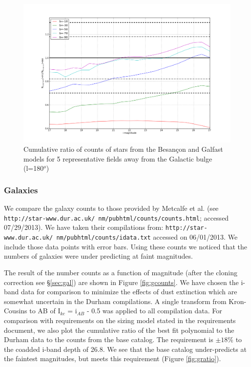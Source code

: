 \documentclass[]{article}
\begin{document}
{\begin{figure}[H]
\includegraphics[width=5in]{validation_figures/cumulative_ratio_stars_180_besancon_dust.png}
\caption{Cumulative ratio of counts of stars from the Besan\c{c}on and Galfast models for 5 representative fields away from the Galactic bulge (l=180$^o$) \label{fig:sratio_180}}
\end{figure}

\subsubsection{Galaxies \label{sec:galaxycounts}}
We compare the galaxy counts to those provided by Metcalfe et al. (see {\tt http://star-www.dur.ac.uk/~nm/pubhtml/counts/counts.html}; 
accessed 07/29/2013).  We have taken their compilations from:
{\tt http://star-www.dur.ac.uk/~nm/pubhtml/counts/idata.txt} accessed on 06/01/2013.  
We include those data points with error bars.  
Using these counts
we noticed that the numbers of galaxies were under predicting at faint magnitudes.  

The result of the number counts as a function of magnitude (after the cloning correction see \S \ref{sec:gal}) are shown in Figure \ref{fig:gcounts}.  
We have chosen the i-band data for comparison to 
minimize the effects of dust extinction which are somewhat uncertain in the Durham compilations.  A single transform from Kron-Cousins to AB of I$_{kc}$ = i$_{AB}$ - 0.5 was applied to
all compilation data.  For comparison with requirements on the sizing model stated in the requirements document, we also plot the cumulative ratio of the best fit polynomial
to the Durham data to the counts from the base catalog.  The requirement is $\pm18\%$ to the coadded i-band depth of 26.8.  We see that the base catalog
under-predicts at the faintest magnitudes, but meets this requirement (Figure \ref{fig:gratio}).

}
\end{document}
